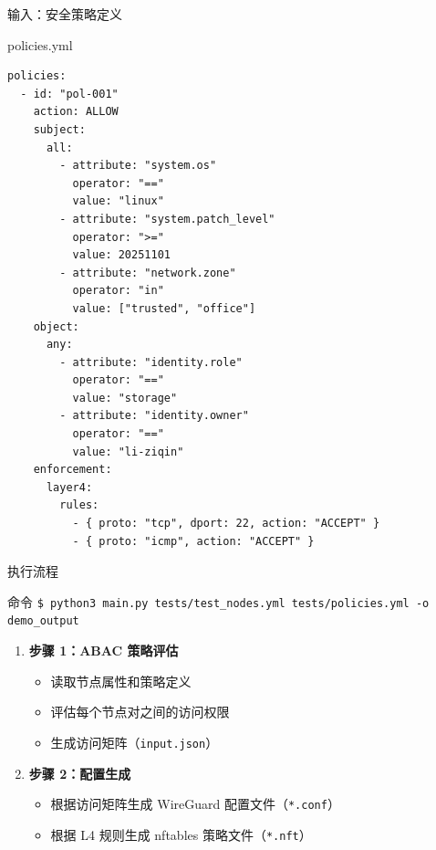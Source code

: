 \documentclass[aspectratio=169, 10pt]{beamer}
\begin{document}
\begin{frame}[fragile]{输入：安全策略定义}
    \begin{block}{policies.yml}
        \lstset{language=yaml, basicstyle=\tiny\ttfamily}
        \begin{lstlisting}
policies:
  - id: "pol-001"
    action: ALLOW
    subject:
      all:
        - attribute: "system.os"
          operator: "=="
          value: "linux"
        - attribute: "system.patch_level"
          operator: ">="
          value: 20251101
        - attribute: "network.zone"
          operator: "in"
          value: ["trusted", "office"]
    object:
      any:
        - attribute: "identity.role"
          operator: "=="
          value: "storage"
        - attribute: "identity.owner"
          operator: "=="
          value: "li-ziqin"
    enforcement:
      layer4:
        rules:
          - { proto: "tcp", dport: 22, action: "ACCEPT" }
          - { proto: "icmp", action: "ACCEPT" }
        \end{lstlisting}
    \end{block}
\end{frame}

\begin{frame}{执行流程}
    \begin{block}{命令}
        \texttt{\$ python3 main.py tests/test\_nodes.yml tests/policies.yml -o demo\_output}
    \end{block}
    
    \begin{enumerate}
        \item \textbf{步骤 1：ABAC 策略评估}
            \begin{itemize}
                \item 读取节点属性和策略定义
                \item 评估每个节点对之间的访问权限
                \item 生成访问矩阵（\texttt{input.json}）
            \end{itemize}
        
        \item \textbf{步骤 2：配置生成}
            \begin{itemize}
                \item 根据访问矩阵生成 WireGuard 配置文件（\texttt{*.conf}）
                \item 根据 L4 规则生成 nftables 策略文件（\texttt{*.nft}）
            \end{itemize}
    \end{enumerate}
\end{frame}
\end{document}
